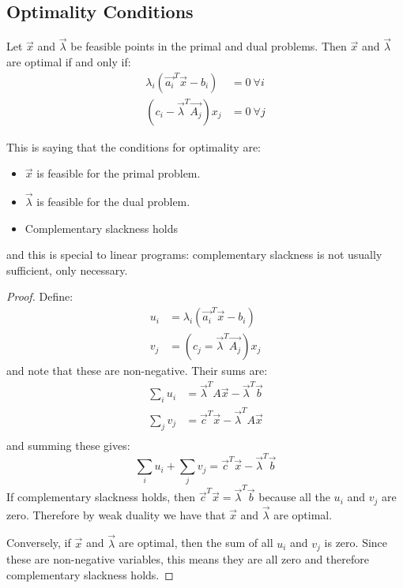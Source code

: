 \documentclass[../Main.tex]{subfiles}
\begin{document}
\subsection{Optimality Conditions}
\begin{theorem}
    Let $\vec{x}$ and $\vec{\lambda}$ be feasible points in the primal and dual problems. Then $\vec{x}$ and $\vec{\lambda}$ are optimal if and only if:
    \begin{align*}
        \lambda_i \left(\vec{a_i}^T \vec{x} - b_i\right) &= 0~\forall i \\
        \left(c_i - \vec{\lambda}^T \vec{A_j}\right)x_j &= 0~\forall j
    \end{align*}
\end{theorem}
\begin{remark}
    This is saying that the conditions for optimality are:
    \begin{itemize}
        \item $\vec{x}$ is feasible for the primal problem.
        \item $\vec{\lambda}$ is feasible for the dual problem.
        \item Complementary slackness holds
    \end{itemize}
    and this is special to linear programs: complementary slackness is not usually sufficient, only necessary.
\end{remark}
\begin{proof}
    Define:
    \begin{align*}
        u_i &= \lambda_i \left(\vec{a_i}^T \vec{x} - b_i\right) \\
        v_j &= \left(c_j = \vec{\lambda}^T \vec{A_j}\right)x_j
    \end{align*}
    and note that these are non-negative. Their sums are:
    \begin{align*}
        \sum_i u_i &= \vec{\lambda}^T A \vec{x} - \vec{\lambda}^T \vec{b} \\
        \sum_j v_j &= \vec{c}^T \vec{x} - \vec{\lambda}^T A \vec{x} \\
    \end{align*}
    and summing these gives:
    \begin{equation*}
        \sum_i u_i + \sum_j v_j = \vec{c}^T \vec{x} - \vec{\lambda}^T \vec{b}
    \end{equation*}
    If complementary slackness holds, then $\vec{c}^T \vec{x} = \vec{\lambda}^T \vec{b}$ because all the $u_i$ and $v_j$ are zero. Therefore by weak duality we have that $\vec{x}$ and $\vec{\lambda}$ are optimal.

    Conversely, if $\vec{x}$ and $\vec{\lambda}$ are optimal, then the sum of all $u_i$ and $v_j$ is zero. Since these are non-negative variables, this means they are all zero and therefore complementary slackness holds.
\end{proof}
\end{document}
